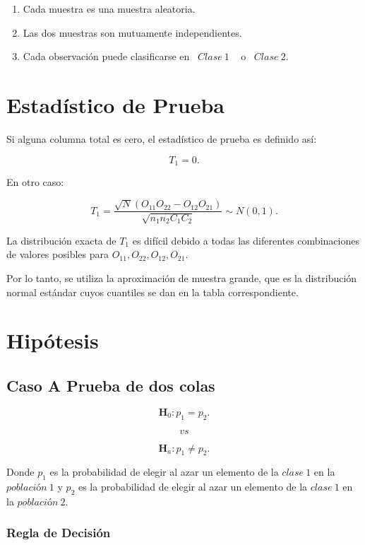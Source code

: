 \documentclass[
  a4paper,
  oneside,
  openany]{book}
\begin{document}
\begin{enumerate}
\def\labelenumi{\arabic{enumi})}
\item
  Cada muestra es una muestra aleatoria.
\item
  Las dos muestras son mutuamente independientes.
\item
  Cada observación puede clasificarse en ~\(Clase\  1\) ~ o ~\(Clase\ 2\).
\end{enumerate}

\hypertarget{estaduxedstico-de-prueba-9}{%
\section{Estadístico de Prueba}\label{estaduxedstico-de-prueba-9}}

Si alguna columna total es cero, el estadístico de prueba es definido así:

\[T_{1}=0.\]

En otro caso:

\[T_{1}=\frac{\sqrt{N}(O_{11}O_{22}-O_{12}O_{21})}{\sqrt{n_{1}n_{2}C_{1}C_{2}}}\sim N(0,1).\]

La distribución exacta de \(T_1\) es difícil debido a todas las diferentes combinaciones de valores posibles para \(O_{11},O_{22},O_{12},O_{21}\).

Por lo tanto, se utiliza la aproximación de muestra grande, que es la distribución normal estándar cuyos cuantiles se dan en la tabla correspondiente.

\hypertarget{hipuxf3tesis-8}{%
\section{Hipótesis}\label{hipuxf3tesis-8}}

\hypertarget{caso-a-prueba-de-dos-colas-7}{%
\subsection*{Caso A Prueba de dos colas}\label{caso-a-prueba-de-dos-colas-7}}


\[\textbf{H}_0: p_{1} = p_{2}.\]

\[vs\]

\[\textbf{H}_a: p_{1} \neq p_{2}.\]

Donde \(p_{1}\) es la probabilidad de elegir al azar un elemento de la \(clase\ 1\) en la \(población\ 1\) y \(p_{2}\) es la probabilidad de elegir al azar un elemento de la \(clase\ 1\) en la \(población\ 2\).

\hypertarget{regla-de-decisiuxf3n-21}{%
\subsubsection*{Regla de Decisión}\label{regla-de-decisiuxf3n-21}}
\end{document}
